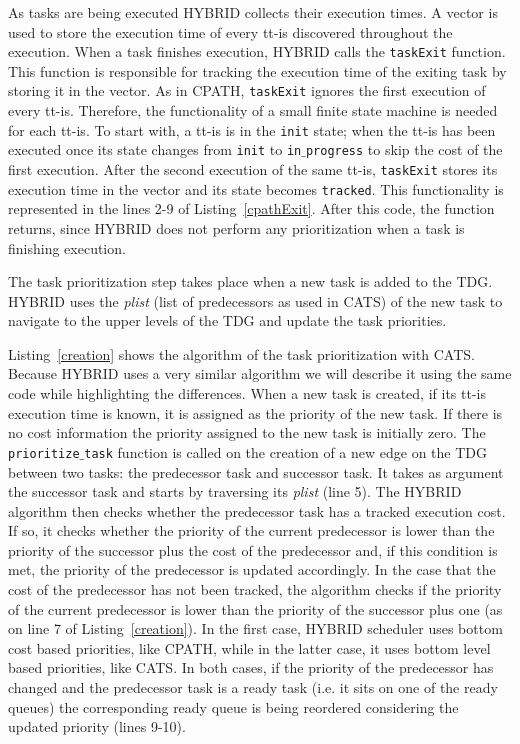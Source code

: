 As tasks are being executed HYBRID collects their execution times.
A vector is used to store the execution time of every tt-is discovered throughout the execution.
When a task finishes execution, HYBRID calls the \texttt{taskExit} function.
This function is responsible for tracking the execution time of the exiting task by storing it in the vector.
As in CPATH, \texttt{taskExit} ignores the first execution of every tt-is.
Therefore, the functionality of a small finite state machine is needed for each tt-is.
To start with, a tt-is is in the \texttt{init} state; when the tt-is has been executed once its state changes from \texttt{init} to \texttt{in$\_$progress} to skip the cost of the first execution.
After the second execution of the same tt-is, \texttt{taskExit} stores its execution time in the vector and its state becomes \texttt{tracked}.
This functionality is represented in the lines 2-9 of Listing~\ref{cpathExit}.
After this code, the function returns, since HYBRID does not perform any prioritization when a task is finishing execution.

The task prioritization step takes place when a new task is added to the TDG.
HYBRID uses the \textit{plist} (list of predecessors as used in CATS) of the new task to navigate to the upper levels of the TDG and update the task priorities.

Listing~\ref{creation} shows the algorithm of the task prioritization with CATS.
Because HYBRID uses a very similar algorithm we will describe it using the same code while highlighting the differences.
When a new task is created, if its tt-is execution time is known, it is assigned as the priority of the new task. 
If there is no cost information the priority assigned to the new task is initially zero.
The \texttt{prioritize$\_$task} function is called on the creation of a new edge on the TDG between two tasks: the predecessor task and successor task.
It takes as argument the successor task and starts by traversing its \textit{plist} (line 5).
The HYBRID algorithm then checks whether the predecessor task has a tracked execution cost.
If so, it checks whether the priority of the current predecessor is lower than the priority of the successor plus the cost of the predecessor and, if this condition is met, the priority of the predecessor is updated accordingly.
In the case that the cost of the predecessor has not been tracked, the algorithm checks if the priority of the current predecessor is lower than the priority of the successor plus one (as on line 7 of Listing~\ref{creation}).
In the first case, HYBRID scheduler uses bottom cost based priorities, like CPATH, while in the latter case, it uses bottom level based priorities, like CATS.
In both cases, if the priority of the predecessor has changed and the predecessor task is a ready task (i.e. it sits on one of the ready queues) the corresponding ready queue is being reordered considering the updated priority (lines 9-10).

